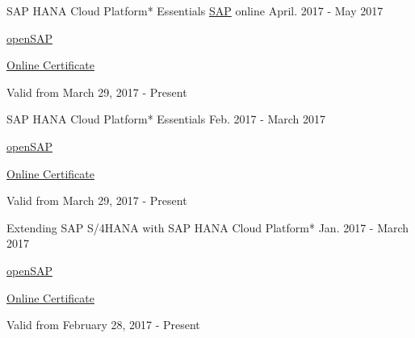

\begin{cventries}

  \cventry
    {SAP HANA Cloud Platform* Essentials} %
    {\href{https://www.sap.com/index.html}{SAP}} %
    {online} %
    {April. 2017 - May 2017} %
    {
	    \begin{cvitems} %
        \item {\href{https://open.sap.com/}{openSAP}} %
        \item {\href{https://open.sap.com/verify/xuhes-rimus-bikon-roper-hicom}{Online Certificate}} %
        \item {Valid from March 29, 2017 - Present} %
      \end{cvitems}
    }    

  \cventry
    {SAP HANA Cloud Platform* Essentials} %
    {} %
    {} %
    {Feb. 2017 - March 2017} %
    {
	    \begin{cvitems} %
        \item {\href{https://open.sap.com/}{openSAP}} %
        \item {\href{https://open.sap.com/verify/xulor-nynoz-soped-muvuv-zitek}{Online Certificate}} %
        \item {Valid from March 29, 2017 - Present} %
      \end{cvitems}
    }        
    
  \cventry
    {Extending SAP S/4HANA with SAP HANA Cloud Platform*} %
    {} %
    {} %
    {Jan. 2017 - March 2017} %
    {
	    \begin{cvitems} %
        \item {\href{https://open.sap.com/}{openSAP}} %
        \item {\href{https://open.sap.com/verify/xugal-vaseb-firih-zadyd-deniv}{Online Certificate}} %
        \item {Valid from February 28, 2017 - Present} %
      \end{cvitems}
    }
   

\end{cventries}
